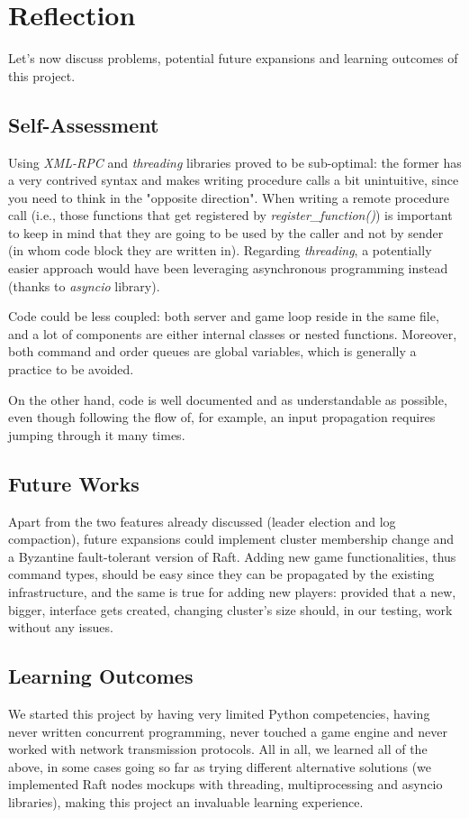 \section{Reflection}

Let's now discuss problems, potential future expansions and learning outcomes of this project.

\subsection{Self-Assessment}

Using \textit{XML-RPC} and \textit{threading} libraries proved to be sub-optimal: the former has a very contrived syntax and makes writing procedure calls a bit unintuitive, since you need to think in the "opposite direction". When writing a remote procedure call (i.e., those functions that get registered by \textit{register\_function()}) is important to keep in mind that they are going to be used by the caller and not by sender (in whom code block they are written in). Regarding \textit{threading}, a potentially easier approach would have been leveraging asynchronous programming instead (thanks to \textit{asyncio} library).

Code could be less coupled: both server and game loop reside in the same file, and a lot of components are either internal classes or nested functions. Moreover, both command and order queues are global variables, which is generally a practice to be avoided.  

On the other hand, code is well documented and as understandable as possible, even though following the flow of, for example, an input propagation requires jumping through it many times.

\subsection{Future Works}

Apart from the two features already discussed (leader election and log compaction), future expansions could implement cluster membership change and a Byzantine fault-tolerant version of Raft. Adding new game functionalities, thus command types, should be easy since they can be propagated by the existing infrastructure, and the same is true for adding new players: provided that a new, bigger, interface gets created, changing cluster's size should, in our testing, work without any issues.  

\subsection{Learning Outcomes}

We started this project by having very limited Python competencies, having never written concurrent programming, never touched a game engine and never worked with network transmission protocols. All in all, we learned all of the above, in some cases going so far as trying different alternative solutions (we implemented Raft nodes mockups with threading, multiprocessing and asyncio libraries), making this project an invaluable learning experience. 